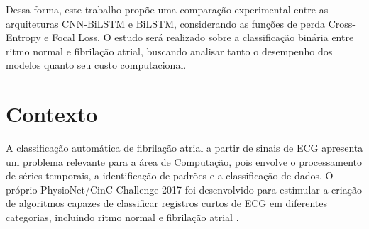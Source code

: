 \documentclass[
    12pt,                %
    openright,           %
    oneside,             %
    a4paper,             %
    english,             %
    brazil               %
]{abntex2}
\begin{document}
Dessa forma, este trabalho propõe uma comparação experimental entre as arquiteturas CNN-BiLSTM e BiLSTM, 
considerando as funções de perda Cross-Entropy e Focal Loss. O estudo será realizado sobre a classificação 
binária entre ritmo normal e fibrilação atrial, buscando analisar tanto o desempenho dos modelos quanto seu custo computacional.



\section{Contexto}
\label{sec:contexto}

A classificação automática de fibrilação atrial a partir de sinais de ECG apresenta 
um problema relevante para a área de Computação, pois envolve o processamento de séries 
temporais, a identificação de padrões e a classificação de dados. O próprio PhysioNet/CinC 
Challenge 2017 foi desenvolvido para estimular a criação de algoritmos capazes de classificar 
registros curtos de ECG em diferentes categorias, incluindo ritmo normal e fibrilação atrial \cite{Clifford2017}.
\end{document}
